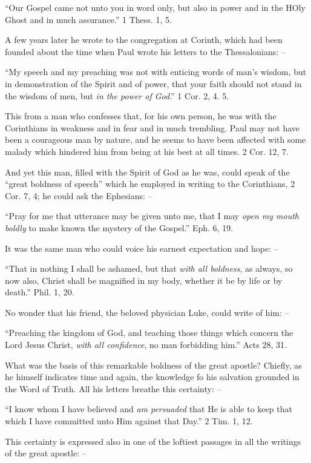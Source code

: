 \documentclass[
]{book}
\begin{document}
``Our Gospel came not unto you in word only, but also in power and in the HOly Ghost and in much assurance.'' 1 Thess. 1, 5.

A few years later he wrote to the congregation at Corinth, which had been founded about the time when Paul wrote his letters to the Thessalonians: --

``My speech and my preaching was not with enticing words of man's wisdom, but in demonstration of the Spirit and of power, that your faith should not stand in the wisdom of men, but \emph{in the power of God}.'' 1 Cor. 2, 4. 5.

This from a man who confesses that, for his own person, he was with the Corinthians in weakness and in fear and in much trembling. Paul may not have been a courageous man by nature, and he seems to have been affected with some malady which hindered him from being at his best at all times. 2 Cor. 12, 7.

And yet this man, filled with the Spirit of God as he was, could speak of the ``great boldness of speech'' which he employed in writing to the Corinthians, 2 Cor. 7, 4; he could ask the Ephesians: --

``Pray for me that utterance may be given unto me, that I may \emph{open my mouth boldly} to make known the mystery of the Gospel.'' Eph. 6, 19.

It was the same man who could voice his earnest expectation and hope: --

``That in nothing I shall be ashamed, but that \emph{with all boldness}, as always, so now also, Christ shall be magnified in my body, whether it be by life or by death.'' Phil. 1, 20.

No wonder that his friend, the beloved physician Luke, could write of him: --

``Preaching the kingdom of God, and teaching those things which concern the Lord Jesus Christ, \emph{with all confidence}, no man forbidding him.'' Acts 28, 31.

What was the basis of this remarkable boldness of the great apostle? Chiefly, as he himself indicates time and again, the knowledge fo his salvation grounded in the Word of Truth. All his letters breathe this certainty: --

``I know whom I have believed and \emph{am persuaded} that He is able to keep that which I have committed unto Him against that Day.'' 2 Tim. 1, 12.

This certainty is expressed also in one of the loftiest passages in all the writings of the great apostle: --
\end{document}
